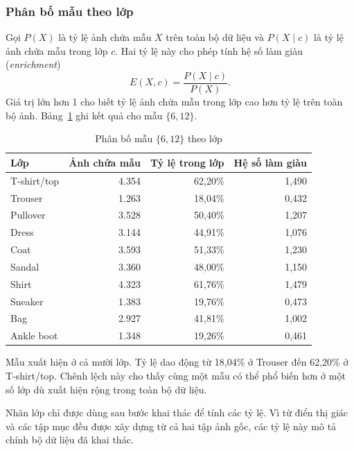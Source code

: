 \subsubsection{Phân bố mẫu theo lớp}
\label{subsec:fim_class_applications}

Gọi $P(X)$ là tỷ lệ ảnh chứa mẫu $X$ trên toàn bộ dữ liệu và
$P(X\mid c)$ là tỷ lệ ảnh chứa mẫu trong lớp $c$. Hai tỷ lệ này
cho phép tính hệ số làm giàu (\textit{enrichment})
\begin{equation}
    E(X,c)=\frac{P(X\mid c)}{P(X)}.
    \label{eq:fim_F_class_enrichment}
\end{equation}
Giá trị lớn hơn 1 cho biết tỷ lệ ảnh chứa mẫu trong lớp cao hơn tỷ lệ trên toàn bộ ảnh. Bảng~\ref{tab:pattern_class_distribution} ghi kết quả cho mẫu $\{6,12\}$.

\begin{table}[!t]
    \centering
    \caption{Phân bố mẫu $\{6,12\}$ theo lớp}
    \label{tab:pattern_class_distribution}
    \scriptsize
    \setlength{\tabcolsep}{2pt}
    \begin{tabular}{@{}l r r r@{}}
        \toprule
        \textbf{Lớp} & \textbf{Ảnh chứa mẫu} & \textbf{Tỷ lệ trong lớp} & \textbf{Hệ số làm giàu} \\
        \midrule
        T-shirt/top & 4.354 & 62,20\% & 1,490 \\
        Trouser & 1.263 & 18,04\% & 0,432 \\
        Pullover & 3.528 & 50,40\% & 1,207 \\
        Dress & 3.144 & 44,91\% & 1,076 \\
        Coat & 3.593 & 51,33\% & 1,230 \\
        Sandal & 3.360 & 48,00\% & 1,150 \\
        Shirt & 4.323 & 61,76\% & 1,479 \\
        Sneaker & 1.383 & 19,76\% & 0,473 \\
        Bag & 2.927 & 41,81\% & 1,002 \\
        Ankle boot & 1.348 & 19,26\% & 0,461 \\
        \bottomrule
    \end{tabular}
\end{table}

Mẫu xuất hiện ở cả mười lớp. Tỷ lệ dao động từ 18,04\% ở Trouser đến 62,20\% ở T-shirt/top. Chênh lệch này cho thấy cùng một mẫu có thể phổ biến hơn ở một số lớp dù xuất hiện rộng trong toàn bộ dữ liệu.

Nhãn lớp chỉ được dùng sau bước khai thác để tính các tỷ lệ.
Vì từ điển thị giác và các tập mục đều được xây dựng từ cả hai
tập ảnh gốc, các tỷ lệ này mô tả chính bộ dữ liệu đã khai thác.


